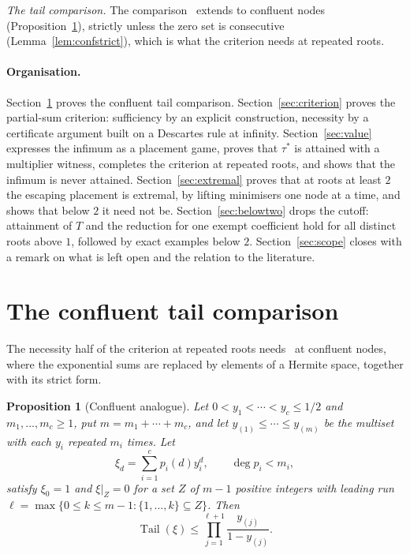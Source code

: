 \documentclass[11pt]{article}
\newtheorem{proposition}[theorem]{Proposition}
\theoremstyle{definition}
\theoremstyle{plain}
\DeclareMathOperator{\Tail}{Tail}
\begin{document}
\emph{The tail comparison.}  The comparison~\cite[Theorem~2.2]{coefficient-mass} extends to confluent nodes
(Proposition~\ref{prop:confluent}), strictly unless the zero set is
consecutive (Lemma~\ref{lem:confstrict}), which is what the criterion needs
at repeated roots.

\paragraph{Organisation.}  Section~\ref{sec:extend} proves the confluent
tail comparison.  Section~\ref{sec:criterion} proves the partial-sum
criterion: sufficiency by an explicit construction, necessity by a
certificate argument built on a Descartes rule at infinity.
Section~\ref{sec:value} expresses the infimum as a placement game, proves
that $\tau^*$ is attained with a multiplier witness, completes the criterion
at repeated roots, and shows that the infimum is never attained.
Section~\ref{sec:extremal} proves that at roots at least $2$ the escaping
placement is extremal, by lifting minimisers one node at a time, and shows
that below $2$ it need not be.  Section~\ref{sec:belowtwo} drops the
cutoff: attainment of $T$ and the reduction for one exempt coefficient hold
for all distinct roots above $1$, followed by exact examples below $2$.  Section~\ref{sec:scope} closes with a remark
on what is left open and the relation to the literature.

\section{The confluent tail comparison}\label{sec:extend}

The necessity half of the criterion at repeated roots needs~\cite[Theorem~2.2]{coefficient-mass} at
confluent nodes, where the exponential sums are replaced by elements of a
Hermite space, together with its strict form.

\begin{proposition}[Confluent analogue]\label{prop:confluent}
Let $0<y_1<\cdots<y_c\le1/2$ and $m_1,\ldots,m_c\ge1$, put $m=m_1+\cdots+m_c$,
and let $y_{(1)}\le\cdots\le y_{(m)}$ be the multiset with each $y_i$ repeated
$m_i$ times.  Let
\[
  \xi_d=\sum_{i=1}^c p_i(d)y_i^d,\qquad \deg p_i<m_i,
\]
satisfy $\xi_0=1$ and $\xi|_Z=0$ for a set $Z$ of $m-1$ positive integers with
leading run $\ell=\max\{0\le k\le m-1:\{1,\ldots,k\}\subseteq Z\}$.  Then
\[
  \Tail(\xi)\le\prod_{j=1}^{\ell+1}\frac{y_{(j)}}{1-y_{(j)}}.
\]
\end{proposition}
\end{document}

